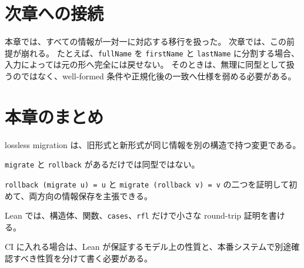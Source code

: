 \section{次章への接続}

本章では、すべての情報が一対一に対応する移行を扱った。
次章では、この前提が崩れる。
たとえば、\texttt{fullName} を \texttt{firstName} と \texttt{lastName} に分割する場合、入力によっては元の形へ完全には戻せない。
そのときは、無理に同型として扱うのではなく、well-formed 条件や正規化後の一致へ仕様を弱める必要がある。

\section{本章のまとめ}

lossless migration は、旧形式と新形式が同じ情報を別の構造で持つ変更である。

\texttt{migrate} と \texttt{rollback} があるだけでは同型ではない。

\texttt{rollback (migrate u) = u} と \texttt{migrate (rollback v) = v} の二つを証明して初めて、両方向の情報保存を主張できる。

Lean では、構造体、関数、\texttt{cases}、\texttt{rfl} だけで小さな round-trip 証明を書ける。

CI に入れる場合は、Lean が保証するモデル上の性質と、本番システムで別途確認すべき性質を分けて書く必要がある。
